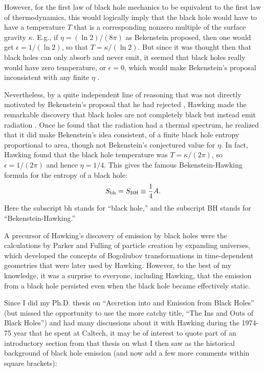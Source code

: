 \documentclass[12pt]{article} \usepackage{latexsym}
\begin{document}
However, for the first law of black hole mechanics to be equivalent to
the first law of thermodynamics, this would logically imply that the
black hole would have to have a temperature $T$ that is a
corresponding nonzero multiple of the surface gravity $\kappa$.  E.g.,
if $\eta = (\ln 2)/(8\pi)$ as Bekenstein proposed, then one would get
$\epsilon = 1/(\ln 2)$, so that $T = \kappa/(\ln 2)$.  But since it
was thought then that black holes can only absorb and never emit, it
seemed that black holes really would have zero temperature, or
$\epsilon = 0$, which would make Bekenstein's proposal inconsistent
with any finite $\eta$ \cite{BCH}.

Nevertheless, by a quite independent line of reasoning that was not
directly motivated by Bekenstein's proposal that he had rejected
\cite{BCH}, Hawking made the remarkable discovery that black holes are
not completely black but instead emit radiation \cite{Haw1,Haw2}.
Once he found that the radiation had a thermal spectrum, he realized
that it did make Bekenstein's idea consistent, of a finite black hole
entropy proportional to area, though not Bekenstein's conjectured
value for $\eta$.  In fact, Hawking found that the black hole
temperature was $T = \kappa/(2\pi)$, so $\epsilon = 1/(2\pi)$ and
hence $\eta = 1/4$.  This gives the famous Bekenstein-Hawking formula
for the entropy of a black hole:
 \begin{equation}
 S_{\mathrm{bh}} = S_{\mathrm{BH}} \equiv {1\over 4} A.
 \label{eq:2}
 \end{equation}
Here the subscript bh stands for ``black hole,'' and the subscript BH
stands for ``Bekenstein-Hawking.''

A precursor of Hawking's discovery of emission by black holes were the
calculations by Parker \cite{Par1,Par2,Par3,Par4} and Fulling
\cite{Full1,Full2} of particle creation by expanding universes, which
developed the concepts of Bogoliubov transformations \cite{Bog} in
time-dependent geometries that were later used by Hawking.  However, to
the best of my knowledge, it was a surprise to everyone, including
Hawking, that the emission from a black hole persisted even when the
black hole became effectively static.

Since I did my Ph.D. thesis \cite{Pagethesis} on ``Accretion into and
Emission from Black Holes'' (but missed the opportunity to use the more
catchy title, ``The Ins and Outs of Black Holes'') and had many
discussions about it with Hawking during the 1974-75 year that he spent
at Caltech, it may be of interest to quote part of an introductory
section from that thesis on what I then saw as the historical background
of black hole emission (and now add a few more comments within square
brackets):
\end{document}
